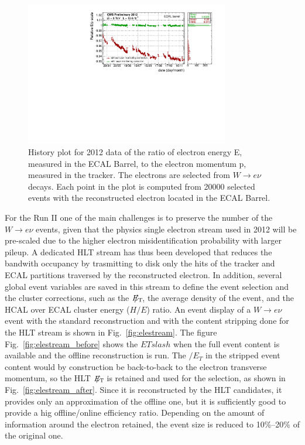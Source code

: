 \documentclass[journal]{IEEEtran}
\newcommand{\ETslash}{\ensuremath{E_{\mathrm{T}}\hspace{-1.1em}/\kern0.45em}}
\begin{document}
\begin{figure}[!t]
  \begin{center}
    \includegraphics[width=3.5in]{EoP_EB_Winter2013}
    \caption{History plot for 2012 data of the ratio of electron energy E, measured in the ECAL Barrel, to the electron momentum p, measured in the tracker.  The electrons are selected from $W\to e\nu$ decays. Each point in the plot is computed from 20000 selected events with the reconstructed electron located in the ECAL Barrel. \label{fig:EoP_2012}}
  \end{center}
\end{figure}
%
For the Run II one of the main challenges is to preserve the number of the $W\to e\nu$ events, given that the physics single electron stream used in 2012 will be pre-scaled due to the higher electron misidentification probability with larger pileup. A dedicated HLT stream has thus been developed that reduces the bandwith occupancy by trasmitting to disk only the hits of the tracker and ECAL partitions traversed by the reconstructed electron. In addition, several global event variables are saved in this stream to define the event selection and the cluster corrections, such as the $\ETslash$, the average density of the event, and the HCAL over ECAL cluster energy ($H/E$) ratio.  An event display of a $W\to e\nu$ event with the standard reconstruction and with the content stripping done for the HLT stream is shown in Fig.~\ref{fig:elestream}. The figure Fig.~\ref{fig:elestream_before} shows the $ETslash$ when the full event content is available and the offline reconstruction is run. The $\slash E_T$ in the stripped event content would by construction be back-to-back to the electron transverse momentum, so the HLT $\ETslash$ is retained and used for the selection, as shown in Fig.~\ref{fig:elestream_after}. Since it is reconstructed by the HLT candidates, it provides only an approximation of the offline one, but it is sufficiently good to provide a hig offline/online efficiency ratio. Depending on the amount of information around the electron retained, the event size is reduced to 10\%--20\% of the original one.
\end{document}

